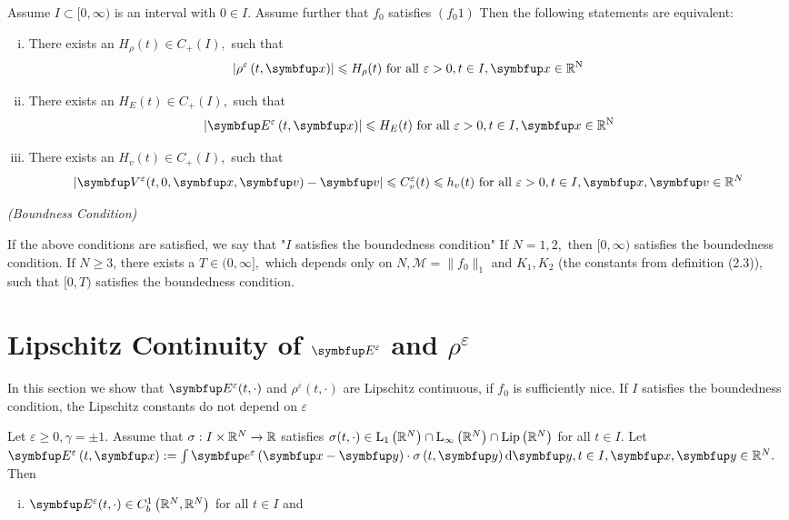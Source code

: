 \begin{lemma}
\begin{theorem}
    Assume  $I \subset[0, \infty)$ is an interval with $0 \in I $. Assume  further that $f_{0}$ satisfies $(f_{0} 1)$
    Then the following statements are equivalent:

    \begin{enumerate}[(i)]
        \item There exists an $H_{\rho}(t) \in C_{+}(I),$ such that 
         $$\left|\rho^{\varepsilon}\left(t, \vx\right)\right| \leqslant H_{\rho}(t) \text{ for all } \varepsilon>0, t \in I, \vx \in \bbR^{\mathrm{N}}$$
        \item There exists an $H_{E}(t) \in C_{+}(I),$ such that 
        $$\left|\vE^{\varepsilon}\left(t, \vx\right)\right| \leqslant H_{E}(t) \text{ for all } \varepsilon>0, t \in I, \vx \in \bbR^{\mathrm{N}}$$
        \item There exists an $H_{v}(t) \in C_{+}(I),$ such that 
        $$ | \vect{V}^{\varepsilon}(t, 0, \vx, \vv)-\vv | \leqslant C_{v}^{\varepsilon}(t) \leqslant h_{v}(t) \text{ for all } \varepsilon>0, t \in I, \vx,\vv \in \bbR^{N}$$
    \end{enumerate}
\end{theorem}

\begin{definition}\textit{(Boundness Condition)}

    If the above conditions are satisfied, we say that "$I$ satisfies the boundedness condition"
    If $N=1,2,$ then $[0, \infty) $ satisfies the boundedness condition.
    $\text {If }N \geqslant 3$, there exists a $T \in( 0, \infty],$ which depends only on $N, \mathcal{M}=\|f_{0}\|_{1}$ and $K_{1}, K_{2}$ (the constants from definition (2.3)), such that $[0, T)$ satisfies the  boundedness condition.
    
\end{definition}




\section{Lipschitz Continuity of \texorpdfstring{$\vE^{\varepsilon}$ and $\rho^{\varepsilon}$}{Lg}}

In this section we show that $\vE^{\varepsilon}(t, \cdot)$ and $\rho^{\varepsilon}(t, \cdot)$ are Lipschitz continuous, if $f_{0}$ is sufficiently nice. If $I$ satisfies the boundedness condition, the Lipschitz constants do not depend on $\varepsilon$

\begin{lemma}
    Let $\varepsilon \geqslant 0, \gamma=\pm 1$. Assume that $\sigma: I \times {\mathbb{R}}^{N} \rightarrow {\mathbb{R}}$ satisfies $\sigma(t, \cdot) \in \mathrm{L}_{1}\left({\mathbb{R}}^{N}\right) \cap \mathrm{L}_{\infty}\left({\mathbb{R}}^{N}\right) \cap \operatorname{Lip}\left({\mathbb{R}}^{N}\right)$ for all $t \in I$. Let  $\vE^\varepsilon\left(t, \vx\right):=\int \vect{e}^{\varepsilon}\left(\vx-\vect{y}\right) \cdot \sigma\left(t, \vect{y}\right) \mathrm{d} \vect{y}, t \in I, \vx,\vect{y} \in \bbR^{N} .$ Then
\begin{enumerate}[(i)]
    \item $\vE^\varepsilon(t, \cdot) \in C_{b}^{1}\left(\bbR^{N}, \bbR^{N}\right)$ for all $t \in I$ and


\end{enumerate}
\end{lemma}
\end{lemma}
